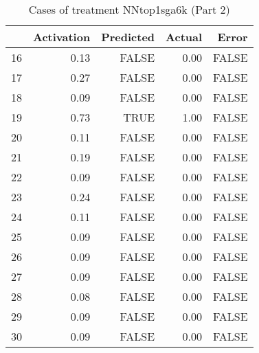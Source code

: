\begin{table}[ht]
\centering
\begin{tabular}{rrrrr}
  \hline
 & Activation & Predicted & Actual & Error \\ 
  \hline
16 & 0.13 & FALSE & 0.00 & FALSE \\ 
  17 & 0.27 & FALSE & 0.00 & FALSE \\ 
  18 & 0.09 & FALSE & 0.00 & FALSE \\ 
  19 & 0.73 & TRUE & 1.00 & FALSE \\ 
  20 & 0.11 & FALSE & 0.00 & FALSE \\ 
  21 & 0.19 & FALSE & 0.00 & FALSE \\ 
  22 & 0.09 & FALSE & 0.00 & FALSE \\ 
  23 & 0.24 & FALSE & 0.00 & FALSE \\ 
  24 & 0.11 & FALSE & 0.00 & FALSE \\ 
  25 & 0.09 & FALSE & 0.00 & FALSE \\ 
  26 & 0.09 & FALSE & 0.00 & FALSE \\ 
  27 & 0.09 & FALSE & 0.00 & FALSE \\ 
  28 & 0.08 & FALSE & 0.00 & FALSE \\ 
  29 & 0.09 & FALSE & 0.00 & FALSE \\ 
  30 & 0.09 & FALSE & 0.00 & FALSE \\ 
   \hline
\end{tabular}
\caption{Cases of treatment NNtop1sga6k (Part 2)} 
\end{table}
